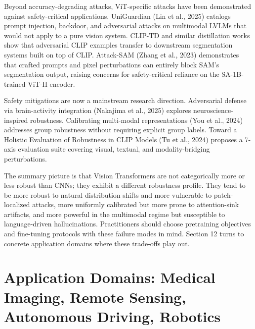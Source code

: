 Beyond accuracy-degrading attacks, ViT-specific attacks have been demonstrated against safety-critical applications. UniGuardian (Lin et al., 2025) catalogs prompt injection, backdoor, and adversarial attacks on multimodal LVLMs that would not apply to a pure vision system. CLIP-TD and similar distillation works show that adversarial CLIP examples transfer to downstream segmentation systems built on top of CLIP. Attack-SAM (Zhang et al., 2023) demonstrates that crafted prompts and pixel perturbations can entirely block SAM's segmentation output, raising concerns for safety-critical reliance on the SA-1B-trained ViT-H encoder.

Safety mitigations are now a mainstream research direction. Adversarial defense via brain-activity integration (Nakajima et al., 2025) explores neuroscience-inspired robustness. Calibrating multi-modal representations (You et al., 2024) addresses group robustness without requiring explicit group labels. Toward a Holistic Evaluation of Robustness in CLIP Models (Tu et al., 2024) proposes a 7-axis evaluation suite covering visual, textual, and modality-bridging perturbations.

The summary picture is that Vision Transformers are not categorically more or less robust than CNNs; they exhibit a different robustness profile. They tend to be more robust to natural distribution shifts and more vulnerable to patch-localized attacks, more uniformly calibrated but more prone to attention-sink artifacts, and more powerful in the multimodal regime but susceptible to language-driven hallucinations. Practitioners should choose pretraining objectives and fine-tuning protocols with these failure modes in mind. Section 12 turns to concrete application domains where these trade-offs play out.

\section{Application Domains: Medical Imaging, Remote Sensing, Autonomous Driving, Robotics}\label{application-domains-medical-imaging-remote-sensing-autonomous-driving-robotics}

